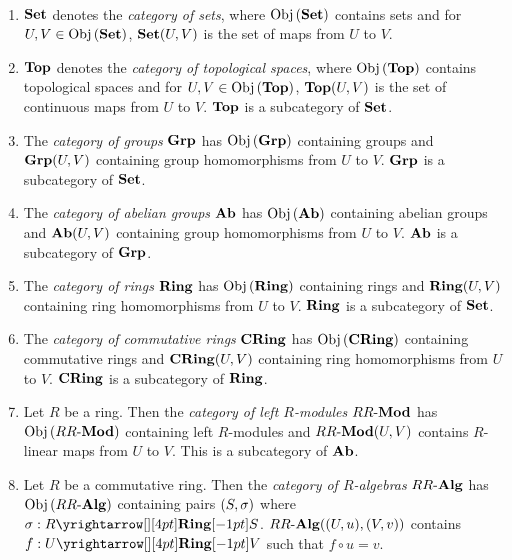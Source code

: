 \begin{eg}~
  \begin{enumerate}
    \item $\mathbf{Set}$ denotes the \emph{category of sets}, where 
    $\mathrm{Obj}\left(\mathbf{Set}\right)$ contains sets and for $U, V \in \mathrm{Obj}\left(\mathbf{Set}\right)$, 
    $\mathbf{Set}(U,V)$ is the set of maps from $U$ to $V$. 
    \item $\mathbf{Top}$ denotes the \emph{category of topological spaces}, where
    $\mathrm{Obj}\left(\mathbf{Top}\right)$ contains topological spaces and for $U, V \in \mathrm{Obj}\left(\mathbf{Top}\right)$, 
    $\mathbf{Top}(U,V)$ is the set of continuous maps from $U$ to $V$. 
    $\mathbf{Top}$ is a subcategory of $\mathbf{Set}$. 
    \item The \emph{category of groups} $\mathbf{Grp}$ has 
    $\mathrm{Obj}\left(\mathbf{Grp}\right)$ containing groups and 
    $\mathbf{Grp}(U,V)$ containing group homomorphisms from $U$ to $V$. 
    $\mathbf{Grp}$ is a subcategory of $\mathbf{Set}$.  
    \item The \emph{category of abelian groups} $\mathbf{Ab}$ has 
    $\mathrm{Obj}\left(\mathbf{Ab}\right)$ containing abelian groups and 
    $\mathbf{Ab}(U,V)$ containing group homomorphisms from $U$ to $V$. 
    $\mathbf{Ab}$ is a subcategory of $\mathbf{Grp}$. 
    \item The \emph{category of rings} $\mathbf{Ring}$ has 
    $\mathrm{Obj}\left(\mathbf{Ring}\right)$ containing rings and 
    $\mathbf{Ring}(U,V)$ containing ring homomorphisms from $U$ to $V$.
    $\mathbf{Ring}$ is a subcategory of $\mathbf{Set}$. 
    \item The \emph{category of commutative rings} $\mathbf{CRing}$ has 
    $\mathrm{Obj}\left(\mathbf{CRing}\right)$ containing commutative rings and 
    $\mathbf{CRing}(U,V)$ containing ring homomorphisms from $U$ to $V$.
    $\mathbf{CRing}$ is a subcategory of $\mathbf{Ring}$. 
    \item Let $R$ be a ring. 
    Then the \emph{category of left $R$-modules} $RR\text{-}\mathbf{Mod}$ has 
    $\mathrm{Obj}\left(RR\text{-}\mathbf{Mod}\right)$ containing left $R$-modules and 
    $RR\text{-}\mathbf{Mod}(U,V)$ contains $R$-linear maps from $U$ to $V$.
    This is a subcategory of $\mathbf{Ab}$. 
    \item Let $R$ be a commutative ring. 
    Then the \emph{category of $R$-algebras} $RR\text{-}\mathbf{Alg}$ has 
    $\mathrm{Obj}\left(RR\text{-}\mathbf{Alg}\right)$ containing pairs $(S,\sigma)$ where 
    $\si : \map{R}{S}{\RING}{}$.
    $RR\text{-}\mathbf{Alg}((U,u),(V,v))$ contains $f : \map{U}{V}{\RING}{}$ such that 
    $f \circ u = v$. 
  \end{enumerate}
\end{eg}

